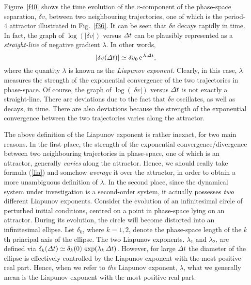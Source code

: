 Figure~\ref{f40} shows the time evolution of the $v$-component of the phase-space
separation, $\delta v$, between two neighbouring trajectories, one of which is the period-4
attractor illustrated in Fig.~\ref{f36}. It can be seen that $\delta v$ decays rapidly
in time. In fact, the graph of $\log(|\delta v|)$ versus ${\mit\Delta} t$ can be plausibly
represented as a {\em straight-line} of negative gradient $\lambda$. In other words,
\begin{equation}
|\delta v({\mit\Delta} t)| \simeq \delta v_0\,{\rm e}^{\,\lambda\,{\mit\Delta t}},\label{lia}
\end{equation}
where the quantity $\lambda$ is known as the {\em Liapunov exponent}. Clearly, in this case,
$\lambda$ measures the strength of the exponential convergence of the two
trajectories in phase-space. 
Of course,
the  graph of $\log(|\delta v|)$ versus ${\mit\Delta} t$ is not exactly a straight-line. There
are deviations due to the fact that $\delta v$ oscillates, as well as decays, in time.
There are  
also deviations because the strength
of the exponential convergence between the two trajectories varies along the attractor. 

The above definition of the Liapunov exponent is rather inexact, for
two main reasons. In the first place,
the strength
of the exponential convergence/divergence between  two neighbouring trajectories in phase-space,
one of which is an attractor, generally {\em varies} along the attractor. Hence, we should really
take formula (\ref{lia}) and somehow {\em average} it over the attractor,
in order to obtain a more unambiguous definition of $\lambda$. In the second place,
since the dynamical system under investigation  is a second-order system, it actually possesses {\em two}
different Liapunov exponents. Consider the evolution of an infinitesimal circle of perturbed
initial conditions, centred on a point in phase-space
lying on an attractor. During its evolution, the circle will become
distorted into an infinitesimal ellipse. Let $\delta_k$, where $k=1,2$, denote the phase-space
length of the $k$th principal axis of the ellipse. The two Liapunov exponents, $\lambda_1$ and $\lambda_2$,
are defined via $\delta_k({\mit\Delta}t)\simeq \delta_k(0)\,\exp(\lambda_k\,{\mit\Delta}t)$. 
However, for large ${\mit\Delta}t$ the diameter of the ellipse is effectively controlled by the 
Liapunov exponent with the most positive real part. Hence, when we refer to
{\em the} Liapunov exponent, $\lambda$, what we generally mean is the Liapunov 
exponent with the most positive real part. 

